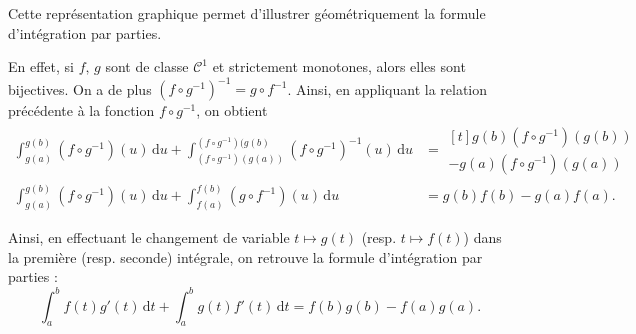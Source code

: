 \begin{remarque}
Cette représentation graphique permet d'illustrer géométriquement la formule d'intégration par parties.

En effet, si $f,\, g$ sont de classe $\mathcal{C}^1$ et strictement monotones, alors elles sont bijectives. On a de plus \mbox{$(f \circ g^{-1})^{-1} = g \circ f^{-1}$}. Ainsi, en appliquant la relation précédente à la fonction $f \circ g^{-1}$, on obtient
\begin{align*}
\int_{g(a)}^{g(b)} (f \circ g^{-1})(u) \,\mathrm{d}u + \int_{(f\circ g^{-1})(g(a))}^{(f\circ g^{-1})(g(b)} (f \circ g^{-1})^{-1}(u) \,\mathrm{d}u &= \begin{multlined}[t] 
g(b) (f \circ g^{-1})(g(b)) \\
- g(a) (f \circ g^{-1})(g(a))
\end{multlined} \\
\int_{g(a)}^{g(b)} (f \circ g^{-1})(u) \,\mathrm{d}u + \int_{f(a)}^{f(b)} (g \circ f^{-1})(u) \,\mathrm{d}u
&= g(b) f(b) - g(a) f(a).
\end{align*}

Ainsi, en effectuant le changement de variable $t \mapsto g(t)$ (resp. $t \mapsto f(t)$) dans la première (resp. seconde) intégrale, on retrouve la formule d'intégration par parties :
\[
\int_a^b f(t) g'(t) \,\mathrm{d}t + \int_a^b g(t) f'(t) \,\mathrm{d}t = f(b) g(b) - f(a) g(a).
\]
\end{remarque}
